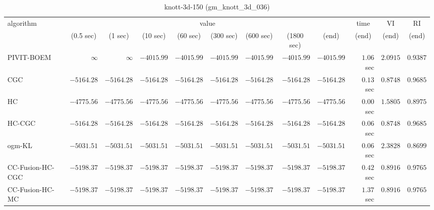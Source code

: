 \begin{table}[H]
\scriptsize
\centering
\caption{knott-3d-150 (gm\_knott\_3d\_036)}
\label{tab:anytimetable-knott-3d-150-gm-knott-3d-036}
\begin{tabular}{lrrrrrrrrrrr}
\toprule
           algorithm &                                   \multicolumn{8}{c}{value} & \multicolumn{1}{c}{time}    & \multicolumn{1}{c}{VI}  & \multicolumn{1}{c}{RI} \\  
\cmidrule(lr){2-9}\cmidrule(lr){10-10} \cmidrule(lr){11-11} \cmidrule(lr){12-12}   
                     & \multicolumn{1}{c}{(0.5 sec)} & \multicolumn{1}{c}{(1 sec)} & \multicolumn{1}{c}{(10 sec)} & \multicolumn{1}{c}{(60 sec)} & \multicolumn{1}{c}{(300 sec)} & \multicolumn{1}{c}{(600 sec)} & \multicolumn{1}{c}{(1800 sec)} & \multicolumn{1}{c}{(end)} & \multicolumn{1}{c}{(end)}    & \multicolumn{1}{c}{(end)}   & \multicolumn{1}{c}{(end)}  \\ \midrule 
          PIVIT-BOEM & $\infty$ & $\infty$ & $     -4015.99$ & $     -4015.99$ & $     -4015.99$ & $     -4015.99$ & $     -4015.99$ & $     -4015.99$ & $         1.06$ sec    & $       2.0915$  & $       0.9387$ \\ 
                 CGC & $     -5164.28$ & $     -5164.28$ & $     -5164.28$ & $     -5164.28$ & $     -5164.28$ & $     -5164.28$ & $     -5164.28$ & $     -5164.28$ & $         0.13$ sec    & $       0.8748$  & $       0.9685$ \\ 
                  HC & $     -4775.56$ & $     -4775.56$ & $     -4775.56$ & $     -4775.56$ & $     -4775.56$ & $     -4775.56$ & $     -4775.56$ & $     -4775.56$ & $         0.00$ sec    & $       1.5805$  & $       0.8975$ \\ 
              HC-CGC & $     -5164.28$ & $     -5164.28$ & $     -5164.28$ & $     -5164.28$ & $     -5164.28$ & $     -5164.28$ & $     -5164.28$ & $     -5164.28$ & $         0.06$ sec    & $       0.8748$  & $       0.9685$ \\ 
              ogm-KL & $     -5031.51$ & $     -5031.51$ & $     -5031.51$ & $     -5031.51$ & $     -5031.51$ & $     -5031.51$ & $     -5031.51$ & $     -5031.51$ & $         0.06$ sec    & $       2.3828$  & $       0.8699$ \\ 
    CC-Fusion-HC-CGC & $     -5198.37$ & $     -5198.37$ & $     -5198.37$ & $     -5198.37$ & $     -5198.37$ & $     -5198.37$ & $     -5198.37$ & $     -5198.37$ & $         0.42$ sec    & $       0.8916$  & $       0.9765$ \\ 
     CC-Fusion-HC-MC & $     -5198.37$ & $     -5198.37$ & $     -5198.37$ & $     -5198.37$ & $     -5198.37$ & $     -5198.37$ & $     -5198.37$ & $     -5198.37$ & $         1.37$ sec    & $       0.8916$  & $       0.9765$ \\ 

\end{tabular}
\end{table}
